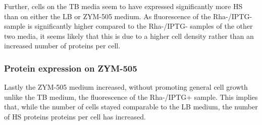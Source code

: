 \documentclass[a4paper]{scrreprt}
\begin{document}
Further, cells on the TB media seem to have expressed significantly more HS
than on either the LB or ZYM-505 medium. As fluorescence of the Rha-/IPTG-
sample is significantly higher compared to the Rha-/IPTG- samples of the other
two media, it seems likely that this is due to a higher cell density rather
than an increased number of proteins per cell.

\subsubsection{Protein expression on ZYM-505}

Lastly the ZYM-505 medium increased, without promoting general cell growth
unlike the TB medium, the fluorescence of the Rha-/IPTG+ sample. This implies
that, while the number of cells stayed comparable to the LB medium, the number
of HS proteins proteins per cell has increased.
\end{document}
